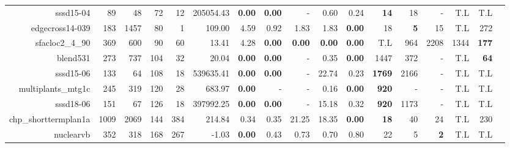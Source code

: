 \begin{table*}[t]
\begin{tabular}{|r|r|r|r|r||r||r|r|r|r|r||r|r|r|r|r|r|}
                        sssd15-04 &           89 &           48 &          72 &          12 &         205054.43 & \textbf{0.00} &\textbf{0.00} &             - &          0.60 &          0.24 &  \textbf{14} &                 18 &                  - &          T.L &          T.L \\ 
                  edgecross14-039 &          183 &         1457 &          80 &           1 &            109.00 &          4.59 &         0.92 &          1.83 &          1.83 & \textbf{0.00} &           18 &         \textbf{5} &                 15 &          T.L &          272 \\ 
                  sfacloc2\_4\_90 &          369 &          600 &          90 &          60 &             13.41 &          4.28 &\textbf{0.00} & \textbf{0.00} & \textbf{0.00} & \textbf{0.00} &          T.L &                964 &               2208 &         1344 & \textbf{177} \\ 
                         blend531 &          273 &          737 &         104 &          32 &             20.04 & \textbf{0.00} &\textbf{0.00} &             - &          0.35 & \textbf{0.00} &         1447 &                372 &                  - &          T.L &  \textbf{64} \\ 
                        sssd15-06 &          133 &           64 &         108 &          18 &         539635.41 & \textbf{0.00} &\textbf{0.00} &             - &         22.74 &          0.23 &\textbf{1769} &               2166 &                  - &          T.L &          T.L \\ 
               multiplants\_mtg1c &          245 &          319 &         120 &          28 &            683.97 & \textbf{0.00} &            - &             - &          0.16 & \textbf{0.00} & \textbf{920} &                  - &                  - &          T.L &          T.L \\ 
                        sssd18-06 &          151 &           67 &         126 &          18 &         397992.25 & \textbf{0.00} &\textbf{0.00} &             - &         15.18 &          0.32 & \textbf{920} &               1173 &                  - &          T.L &          T.L \\ 
             chp\_shorttermplan1a &         1009 &         2069 &         144 &         384 &            214.84 &          0.34 &         0.35 &         21.25 &         18.35 & \textbf{0.00} &  \textbf{18} &                 40 &                 24 &          T.L &          230 \\ 
                        nuclearvb &          352 &          318 &         168 &         267 &             -1.03 & \textbf{0.00} &         0.43 &          0.73 &          0.70 &          0.80 &           22 &                  5 &         \textbf{2} &          T.L &          T.L \\ 

\end{tabular}
\end{table*}
